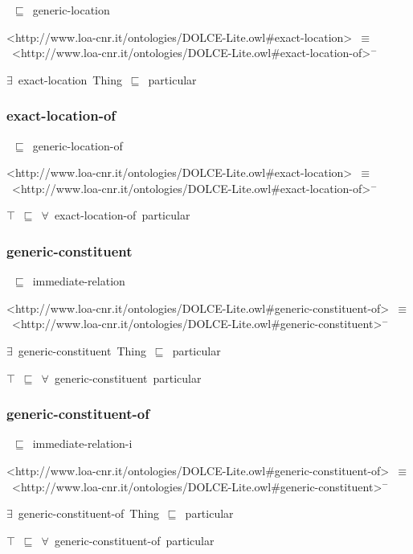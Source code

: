 \documentclass{article}
\begin{document}
~\ensuremath{\sqsubseteq}~generic-location

<http://www.loa-cnr.it/ontologies/DOLCE-Lite.owl#exact-location>~\ensuremath{\equiv}~<http://www.loa-cnr.it/ontologies/DOLCE-Lite.owl#exact-location-of>\ensuremath{^-}

\ensuremath{\exists}~exact-location~Thing~\ensuremath{\sqsubseteq}~particular

\subsubsection*{exact-location-of}

~\ensuremath{\sqsubseteq}~generic-location-of

<http://www.loa-cnr.it/ontologies/DOLCE-Lite.owl#exact-location>~\ensuremath{\equiv}~<http://www.loa-cnr.it/ontologies/DOLCE-Lite.owl#exact-location-of>\ensuremath{^-}

\ensuremath{\top}~\ensuremath{\sqsubseteq}~\ensuremath{\forall}~exact-location-of~particular

\subsubsection*{generic-constituent}

~\ensuremath{\sqsubseteq}~immediate-relation

<http://www.loa-cnr.it/ontologies/DOLCE-Lite.owl#generic-constituent-of>~\ensuremath{\equiv}~<http://www.loa-cnr.it/ontologies/DOLCE-Lite.owl#generic-constituent>\ensuremath{^-}

\ensuremath{\exists}~generic-constituent~Thing~\ensuremath{\sqsubseteq}~particular

\ensuremath{\top}~\ensuremath{\sqsubseteq}~\ensuremath{\forall}~generic-constituent~particular

\subsubsection*{generic-constituent-of}

~\ensuremath{\sqsubseteq}~immediate-relation-i

<http://www.loa-cnr.it/ontologies/DOLCE-Lite.owl#generic-constituent-of>~\ensuremath{\equiv}~<http://www.loa-cnr.it/ontologies/DOLCE-Lite.owl#generic-constituent>\ensuremath{^-}

\ensuremath{\exists}~generic-constituent-of~Thing~\ensuremath{\sqsubseteq}~particular

\ensuremath{\top}~\ensuremath{\sqsubseteq}~\ensuremath{\forall}~generic-constituent-of~particular
\end{document}
